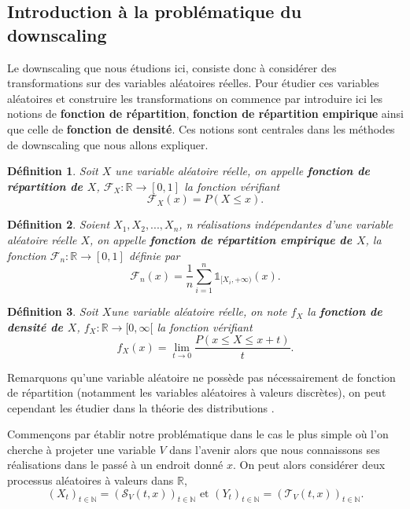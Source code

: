 \documentclass[a4paper,11pt]{article}
\numberwithin{equation}{section}
\newtheorem{definition}{Définition}
\begin{document}
\subsection{Introduction à la problématique du downscaling}
\label{ch:intro-dwnsc}
Le downscaling que nous étudions ici, consiste donc à considérer des transformations sur des variables aléatoires réelles. Pour étudier ces variables aléatoires et construire les transformations on commence par introduire ici les notions de \textbf{fonction de répartition}, \textbf{fonction de répartition empirique} ainsi que celle de \textbf{fonction de densité}. Ces notions sont centrales dans les méthodes de downscaling que nous allons expliquer.

\begin{definition}
	Soit $X$ une variable aléatoire réelle, on appelle \textbf{fonction de répartition de $X$}, $\mathcal{F}_{X}: \mathbb{R}\to [0,1]$ la fonction vérifiant
	\begin{equation}
		\mathcal{F}_{X}(x)=P(X\leq x).
	\end{equation}
\end{definition}

\begin{definition}
	Soient $X_1,X_2,...,X_n$, n réalisations indépendantes d'une variable aléatoire réelle $X$, on appelle \textbf{fonction de répartition empirique de $X$}, la fonction $\mathcal{F}_{n}:\mathbb{R}\to [0,1]$ définie par
	\begin{equation}
		\mathcal{F}_{n}(x)= \frac{1}{n}\sum_{i=1}^{n}\mathds{1}_{[X_i, +\infty )}(x).
	\end{equation}
\end{definition}

\begin{definition}
	Soit $X$une variable aléatoire réelle, on note $f_{X}$ la \textbf{fonction de densité de $X$}, $f_{X}: \mathbb{R}\to [0,\infty[$ la fonction vérifiant
	\begin{equation}
		f_{X}(x)=\lim_{t\to 0} \frac{P(x\leq X \leq x+t)}{t}.
	\end{equation}
\end{definition}
Remarquons qu'une variable aléatoire ne possède pas nécessairement de fonction de répartition (notamment les variables aléatoires à valeurs discrètes), on peut cependant les étudier dans la théorie des distributions \cite{golse2020distributions}.

Commençons par établir notre problématique dans le cas le plus simple où l'on cherche à projeter une variable $V$ dans l'avenir alors que nous connaissons ses réalisations dans le passé à un endroit donné $x$.
On peut alors considérer deux processus aléatoires à valeurs dans $\mathbb{R}$, 
\[(X_t)_{t \in \mathbb{N}}=(\mathcal{S}_{V}(t, x))_{t \in \mathbb{N}} \textrm{ et } (Y_t)_{t \in \mathbb{N}}=(\mathcal{T}_{V}(t, x))_{t \in \mathbb{N}}.\]
\end{document}
